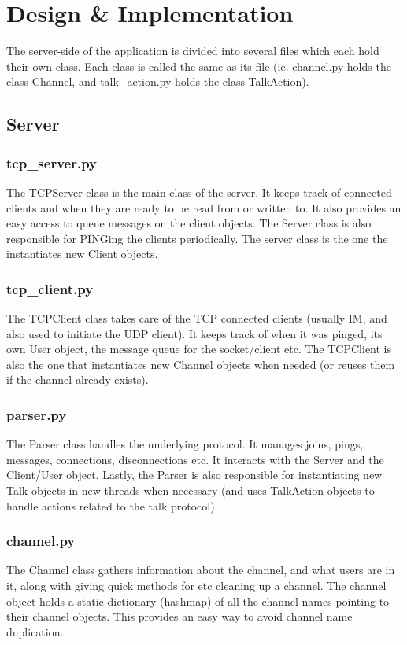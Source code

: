 \documentclass[12pt]{rapport}
\begin{document}
\section*{Design \& Implementation}
The server-side of the application is divided into several files which
each hold their own class. Each class is called the same as its file
(ie. channel.py holds the class Channel, and talk\_action.py holds the
class TalkAction).

\subsection*{Server}
\subsubsection*{tcp\_server.py}
The TCPServer class is the main class of the server. It keeps track of
connected clients and when they are ready to be read from or written
to. It also provides an easy access to queue messages on the client
objects. The Server class is also responsible for PINGing the clients
periodically. The server class is the one the instantiates new Client
objects.

\subsubsection*{tcp\_client.py}
The TCPClient class takes care of the TCP connected clients (usually
IM, and also used to initiate the UDP client). It keeps track of when
it was pinged, its own User object, the message queue for the
socket/client etc. The TCPClient is also the one that instantiates new
Channel objects when needed (or reuses them if the channel already
exists).

\subsubsection*{parser.py}
The Parser class handles the underlying protocol. It manages joins,
pings, messages, connections, disconnections etc. It interacts with
the Server and the Client/User object. Lastly, the Parser is also
responsible for instantiating new Talk objects in new threads when
necessary (and uses TalkAction objects to handle actions related to
the talk protocol).

\subsubsection*{channel.py}
The Channel class gathers information about the channel, and what
users are in it, along with giving quick methods for etc cleaning up a
channel. The channel object holds a static dictionary (hashmap) of all
the channel names pointing to their channel objects. This provides an
easy way to avoid channel name duplication.
\end{document}
